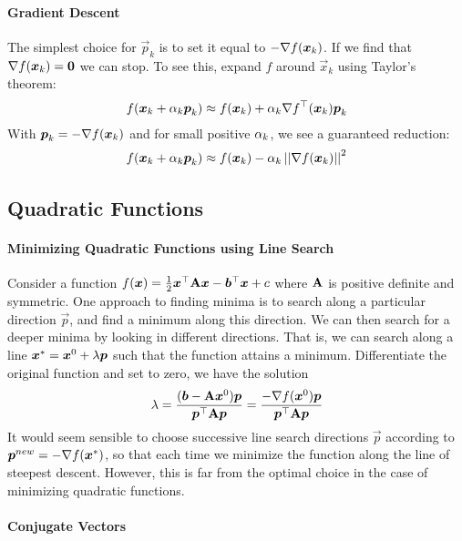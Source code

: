 \paragraph{Gradient Descent}

The simplest choice for $\vec{p}_k$ is to set it equal to $-\nabla f(\boldsymbol{x}_k)$. If we find that $\nabla f(\boldsymbol{x}_k)=\boldsymbol{0}$ we can stop. To see this, expand $f$ around $\vec{x}_k$ using Taylor's theorem:
\begin{align*}
	f(\boldsymbol{x}_k+\alpha_k\boldsymbol{p}_k)\approx f(\boldsymbol{x}_k)+\alpha_k\nabla f^\top(\boldsymbol{x}_k)\boldsymbol{p}_k
\end{align*}
With $\boldsymbol{p}_k=-\nabla f(\boldsymbol{x}_k)$ and for small positive $\alpha_k$, we see a guaranteed reduction:
\begin{align*}
	f(\boldsymbol{x}_k+\alpha_k\boldsymbol{p}_k)\approx f(\boldsymbol{x}_k)-\alpha_k\left\vert\left\vert \nabla f(\boldsymbol{x}_k) \right\vert\right\vert^2
\end{align*}

\subsection{Quadratic Functions}

\paragraph{Minimizing Quadratic Functions using Line Search}

Consider a function $f(\boldsymbol{x})=\frac{1}{2}\boldsymbol{x}{}^\top\mathbf{A}\boldsymbol{x}-\boldsymbol{b}{}^\top\boldsymbol{x}+c$ where $\mathbf{A}$ is positive definite and symmetric. One approach to finding minima is to search along a particular direction $\vec{p}$, and find a minimum along this direction. We can then search for a deeper minima by looking in different directions. That is, we can search along a line $\boldsymbol{x}^*=\boldsymbol{x}^0+\lambda\boldsymbol{p}$ such that the function attains a minimum. Differentiate the original function and set to zero, we have the solution
\begin{align*}
	\lambda=\frac{(\boldsymbol{b}-\mathbf{A}\boldsymbol{x}^0)\boldsymbol{p}}{\boldsymbol{p}{}^\top\mathbf{A}\boldsymbol{p}}=\frac{-\nabla f(\boldsymbol{x}^0)\boldsymbol{p}}{\boldsymbol{p}{}^\top\mathbf{A}\boldsymbol{p}}
\end{align*}
It would seem sensible to choose successive line search directions $\vec{p}$ according to $\boldsymbol{p}^{new}=-\nabla f(\boldsymbol{x}^*)$, so that each time we minimize the function along the line of steepest descent. However, this is far from the optimal choice in the case of minimizing quadratic functions.

\paragraph{Conjugate Vectors}

